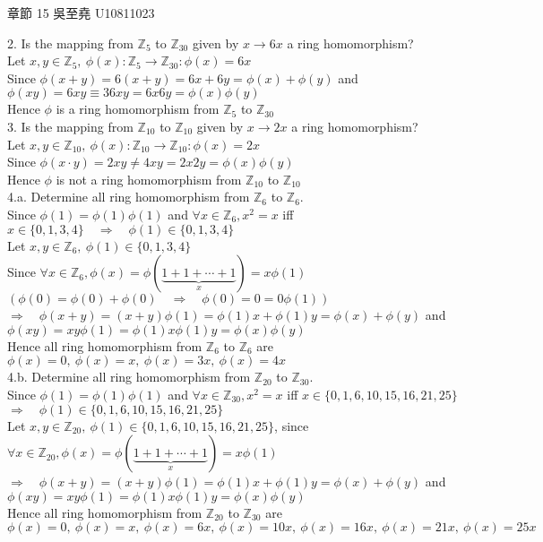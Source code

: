 \documentclass[12pt]{book}
\author{andersonwu2000}
\begin{document}
\begin{CJK}{UTF8}{bsmi}

\hfill 章節 15 吳至堯 U10811023

2. Is the mapping from $\mathbb{Z}_5$ to $\mathbb{Z}_{30}$ given by $x\rightarrow6x$ a ring homomorphism? \\
Let $x, y\in \mathbb{Z}_5,\  \phi(x):\mathbb{Z}_5\rightarrow\mathbb{Z}_{30}:\phi(x)=6x$ \\
Since $\phi(x+y)=6(x+y)=6x+6y=\phi(x)+\phi(y)$ and $\phi(xy)=6xy\equiv36xy=6x6y=\phi(x)\phi(y)$ \\
Hence $\phi$ is a ring homomorphism from $\mathbb{Z}_5$ to $\mathbb{Z}_{30}$ \\

3. Is the mapping from $\mathbb{Z}_{10}$ to $\mathbb{Z}_{10}$ given by $x\rightarrow2x$ a ring homomorphism? \\
Let $x, y\in \mathbb{Z}_{10},\  \phi(x):\mathbb{Z}_{10}\rightarrow\mathbb{Z}_{10}:\phi(x)=2x$ \\
Since $\phi(x\cdot y)=2xy\ne4xy=2x2y=\phi(x)\phi(y)$ \\
Hence $\phi$ is not a ring homomorphism from $\mathbb{Z}_{10}$ to $\mathbb{Z}_{10}$ \\

4.a. Determine all ring homomorphism from $\mathbb{Z}_6$ to $\mathbb{Z}_6$. \\
Since $\phi(1)=\phi(1)\phi(1)$ and $\forall x\in\mathbb{Z}_6, x^2=x$ iff $x\in\{0, 1, 3, 4\}\quad\Rightarrow\quad\phi(1)\in\{0, 1, 3, 4\}$ \\
Let $x, y\in\mathbb{Z}_6,\ \phi(1)\in\{0, 1, 3, 4\}$ \\
Since $\forall x\in\mathbb{Z}_6, \phi(x)=\phi(\underset{x}{\underbrace{1+1+\cdots+1}})=x\phi(1)$\hfill$(\phi(0)=\phi(0)+\phi(0)\quad\Rightarrow\quad\phi(0)=0=0\phi(1))$ \\
$\Rightarrow\quad\phi(x+y)=(x+y)\phi(1)=\phi(1)x+\phi(1)y=\phi(x)+\phi(y)$ and $\phi(xy)=xy\phi(1)=\phi(1)x\phi(1)y=\phi(x)\phi(y)$ \\
Hence all ring homomorphism from $\mathbb{Z}_6$ to $\mathbb{Z}_6$ are $\phi(x)=0,\ \phi(x)=x,\ \phi(x)=3x,\ \phi(x)=4x$ \\

4.b. Determine all ring homomorphism from $\mathbb{Z}_{20}$ to $\mathbb{Z}_{30}$. \\
Since $\phi(1)=\phi(1)\phi(1)$ and $\forall x\in\mathbb{Z}_{30}, x^2=x$ iff $x\in\{0, 1, 6, 10, 15, 16, 21, 25\}$ \\
$\Rightarrow\quad\phi(1)\in\{0, 1, 6, 10, 15, 16, 21, 25\}$ \\
Let $x, y\in\mathbb{Z}_{20},\ \phi(1)\in\{0, 1, 6, 10, 15, 16, 21, 25\}$, since $\forall x\in\mathbb{Z}_{20}, \phi(x)=\phi(\underset{x}{\underbrace{1+1+\cdots+1}})=x\phi(1)$ \\
$\Rightarrow\quad\phi(x+y)=(x+y)\phi(1)=\phi(1)x+\phi(1)y=\phi(x)+\phi(y)$ and $\phi(xy)=xy\phi(1)=\phi(1)x\phi(1)y=\phi(x)\phi(y)$ \\
Hence all ring homomorphism from $\mathbb{Z}_{20}$ to $\mathbb{Z}_{30}$ are \\
$\phi(x)=0,\ \phi(x)=x,\ \phi(x)=6x,\ \phi(x)=10x,\ \phi(x)=16x,\ \phi(x)=21x,\ \phi(x)=25x$ \\


\end{CJK}
\end{document}
